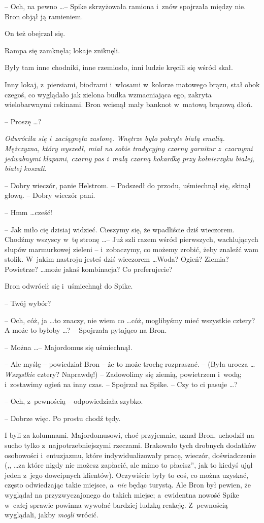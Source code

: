 \documentclass[oneside,polish,11pt,rmheadings]{mwbk}
\begin{document}
-- Och, na pewno \ldots  -- Spike skrzyżowała ramiona i~znów spojrzała między nie. Bron objął ją ramieniem. 

On też obejrzał się. 

Rampa się zamknęła; lokaje zniknęli. 

Były tam inne chodniki, inne rzemiosło, inni ludzie kręcili się wśród skał. 

Inny lokaj, z~piersiami, biodrami i~włosami w~kolorze matowego brązu, stał obok czegoś, co wyglądało jak zielona budka wzmacniająca ego, zakryta wielobarwnymi cekinami. Bron wcisnął mały banknot w~matową brązową dłoń. 

-- Proszę  \ldots  ? 

\textit{Odwróciła się i~zaciągnęła zasłonę. Wnętrze było pokryte białą emalią. Mężczyzna, który wyszedł, miał na sobie tradycyjny czarny garnitur z~czarnymi jedwabnymi klapami, czarny pas i~małą czarną kokardkę przy kołnierzyku białej, białej koszuli}.

-- Dobry wieczór, panie Helstrom. -- Podszedł do przodu, uśmiechnął się, skinął głową. -- Dobry wieczór pani.

-- Hmm \ldots  cześć! 

-- Jak miło cię dzisiaj widzieć. Cieszymy się, że wpadliście dziś wieczorem. Chodźmy wszyscy w~tę stronę \ldots  -- Już szli razem wśród pierwszych, wachlujących słupów marmurkowej zieleni -- i~zobaczymy, co możemy zrobić, żeby znaleźć wam stolik. W~jakim nastroju jesteś dziś wieczorem \ldots  Woda? Ogień? Ziemia? Powietrze?  \ldots  może jakaś kombinacja? Co preferujecie? 

Bron odwrócił się i~uśmiechnął do Spike. 

-- Twój wybór?  

-- Och, cóż, ja \ldots   to znaczy, nie wiem co \ldots  cóż, moglibyśmy mieć wszystkie cztery? A może to byłoby \ldots ? -- Spojrzała pytająco na Bron. 

-- Można  \ldots  -- Majordomus się uśmiechnął. 

-- Ale myślę -- powiedział Bron -- że to może trochę rozpraszać. -- (Była urocza \ldots  \textit{Wszystkie }cztery? Naprawdę!) -- Zadowolimy się ziemią, powietrzem i~wodą; i~zostawimy ogień na inny czas. -- Spojrzał na Spike. -- Czy to ci pasuje  \ldots  ? 

-- Och, z~pewnością -- odpowiedziała szybko. 

-- Dobrze więc. Po prostu chodź tędy. 

I byli za kolumnami. Majordomusowi, choć przyjemnie, uznał Bron, uchodził na sucho tylko z~najpotrzebniejszymi rzeczami. Brakowało tych drobnych dodatków osobowości i~entuzjazmu, które indywidualizowały pracę, wieczór, doświadczenie (,, \ldots  za które nigdy nie możesz zapłacić, ale mimo to płacisz'', jak to kiedyś ujął jeden z~jego dowcipnych klientów). Oczywiście były to coś, co można uzyskać, często odwiedzając takie miejsce, a~\textit{nie }będąc turystą. Ale Bron był pewien, że wyglądał na przyzwyczajonego do takich miejsc; a~ewidentna nowość Spike w~całej sprawie powinna wywołać bardziej ludzką reakcję. Z~pewnością wyglądali, jakby \textit{mogli }wrócić. 
\end{document}
